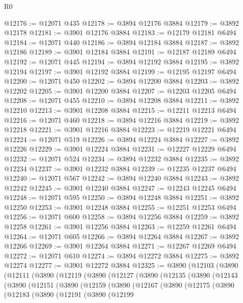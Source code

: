 \begin{lexlean}{R0}
\begin{coremodule}
@12176 := @12071 @435
@12178 := @3894 @12176 @3884
@12179 := @3892 @12178
@12181 := @3901 @12176 @3884
@12183 := @12179 @12181 @6494
@12184 := @12071 @440
@12186 := @3894 @12184 @3884
@12187 := @3892 @12186
@12189 := @3901 @12184 @3884
@12191 := @12187 @12189 @6494
@12192 := @12071 @445
@12194 := @3894 @12192 @3884
@12195 := @3892 @12194
@12197 := @3901 @12192 @3884
@12199 := @12195 @12197 @6494
@12200 := @12071 @450
@12202 := @3894 @12200 @3884
@12203 := @3892 @12202
@12205 := @3901 @12200 @3884
@12207 := @12203 @12205 @6494
@12208 := @12071 @455
@12210 := @3894 @12208 @3884
@12211 := @3892 @12210
@12213 := @3901 @12208 @3884
@12215 := @12211 @12213 @6494
@12216 := @12071 @460
@12218 := @3894 @12216 @3884
@12219 := @3892 @12218
@12221 := @3901 @12216 @3884
@12223 := @12219 @12221 @6494
@12224 := @12071 @519
@12226 := @3894 @12224 @3884
@12227 := @3892 @12226
@12229 := @3901 @12224 @3884
@12231 := @12227 @12229 @6494
@12232 := @12071 @524
@12234 := @3894 @12232 @3884
@12235 := @3892 @12234
@12237 := @3901 @12232 @3884
@12239 := @12235 @12237 @6494
@12240 := @12071 @567
@12242 := @3894 @12240 @3884
@12243 := @3892 @12242
@12245 := @3901 @12240 @3884
@12247 := @12243 @12245 @6494
@12248 := @12071 @595
@12250 := @3894 @12248 @3884
@12251 := @3892 @12250
@12253 := @3901 @12248 @3884
@12255 := @12251 @12253 @6494
@12256 := @12071 @600
@12258 := @3894 @12256 @3884
@12259 := @3892 @12258
@12261 := @3901 @12256 @3884
@12263 := @12259 @12261 @6494
@12264 := @12071 @605
@12266 := @3894 @12264 @3884
@12267 := @3892 @12266
@12269 := @3901 @12264 @3884
@12271 := @12267 @12269 @6494
@12272 := @12071 @610
@12274 := @3894 @12272 @3884
@12275 := @3892 @12274
@12277 := @3901 @12272 @3884
@12325 := @3890
    (@12103
      (@3890
        (@12111
          (@3890
            (@12119
              (@3890
                (@12127
                  (@3890
                    (@12135
                      (@3890
                        (@12143
                          (@3890
                            (@12151
                              (@3890
                                (@12159
                                  (@3890
                                    (@12167
                                      (@3890
                                        (@12175
                                          (@3890
                                            (@12183
                                              (@3890
                                                (@12191
                                                  (@3890
                                                    (@12199

\end{coremodule}
\end{lexlean}
